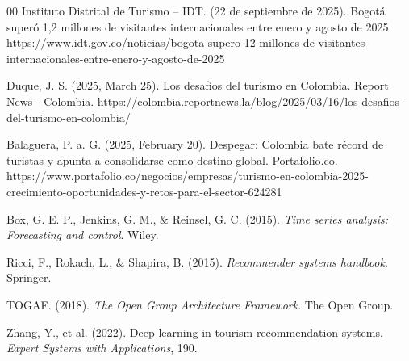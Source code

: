 \documentclass[12pt, letterpaper]{article}
\begin{document}
\begin{thebibliography}{00}
Instituto Distrital de Turismo – IDT. (22 de septiembre de 2025). Bogotá superó 1,2 millones de visitantes internacionales entre enero y agosto de 2025. https://www.idt.gov.co/noticias/bogota-supero-12-millones-de-visitantes-internacionales-entre-enero-y-agosto-de-2025

Duque, J. S. (2025, March 25). Los desafíos del turismo en Colombia. Report News - Colombia. https://colombia.reportnews.la/blog/2025/03/16/los-desafios-del-turismo-en-colombia/

Balaguera, P. a. G. (2025, February 20). Despegar: Colombia bate récord de turistas y apunta a consolidarse como destino global. Portafolio.co. https://www.portafolio.co/negocios/empresas/turismo-en-colombia-2025-crecimiento-oportunidades-y-retos-para-el-sector-624281

 Box, G. E. P., Jenkins, G. M., \& Reinsel, G. C. (2015). \textit{Time series analysis: Forecasting and control}. Wiley.

 Ricci, F., Rokach, L., \& Shapira, B. (2015). \textit{Recommender systems handbook}. Springer.

 TOGAF. (2018). \textit{The Open Group Architecture Framework}. The Open Group.

 Zhang, Y., et al. (2022). Deep learning in tourism recommendation systems. \textit{Expert Systems with Applications}, 190.

\end{thebibliography}
\end{document}
